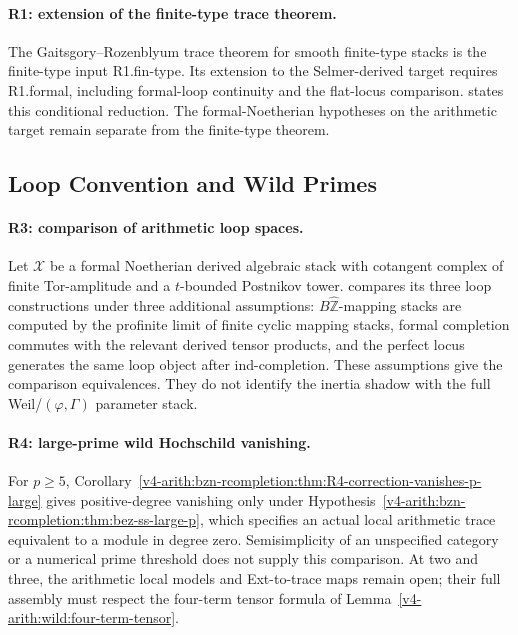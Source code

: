 \paragraph{R1: extension of the finite-type trace theorem.}
The Gaitsgory--Rozenblyum trace theorem for smooth finite-type
stacks is the finite-type input R1.fin-type.
Its extension to the Selmer-derived target requires R1.formal,
including formal-loop continuity and the flat-locus comparison.
 states this
conditional reduction. The formal-Noetherian hypotheses on the
arithmetic target remain separate from the finite-type theorem.

\subsection{Loop Convention and Wild Primes}
\label{v4-arith:w3-comparison-A:ch33}

\paragraph{R3: comparison of arithmetic loop spaces.}
Let \(\mathcal X\) be a formal Noetherian derived algebraic stack
with cotangent complex of finite Tor-amplitude and a
\(t\)-bounded Postnikov tower.
 compares its
three loop constructions under three additional assumptions:
\(B\widehat{\mathbb Z}\)-mapping stacks are computed by the
profinite limit of finite cyclic mapping stacks, formal completion
commutes with the relevant derived tensor products, and the perfect
locus generates the same loop object after ind-completion.
These assumptions give the comparison equivalences.
They do not identify the inertia shadow with the full
Weil/\((\varphi,\Gamma)\) parameter stack.

\paragraph{R4: large-prime wild Hochschild vanishing.}
For \(p\ge5\),
Corollary~\ref{v4-arith:bzn-rcompletion:thm:R4-correction-vanishes-p-large}
gives positive-degree vanishing only under
Hypothesis~\ref{v4-arith:bzn-rcompletion:thm:bez-ss-large-p},
which specifies an actual local arithmetic trace equivalent to a
module in degree zero. Semisimplicity of an unspecified category
or a numerical prime threshold does not supply this comparison.
At two and three, the arithmetic local models and Ext-to-trace maps
remain open; their full assembly must respect the four-term tensor
formula of Lemma~\ref{v4-arith:wild:four-term-tensor}.

